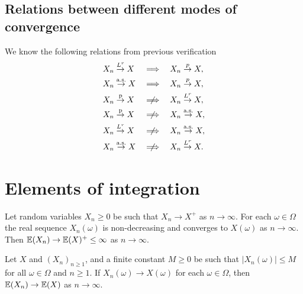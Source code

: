 \documentclass[10pt, a4paper]{article}
\begin{document}
\subsection{Relations between different modes of convergence}
We know the following relations from previous verification
\begin{align*}
    X_n &\overset{L ^ r}{\to} X &\implies && X_n &\overset{p}{\to} X, \\
    X_n &\overset{\text{a.s.}}{\to} X &\implies && X_n &\overset{p}{\to} X, \\
    X_n &\overset{\text{p}}{\to} X &\centernot\implies && X_n &\overset{L ^ r}{\to} X, \\
    X_n &\overset{\text{p}}{\to} X &\centernot\implies && X_n &\overset{\text{a.s.}}{\to} X, \\
    X_n &\overset{L ^ r}{\to} X &\centernot\implies && X_n &\overset{\text{a.s.}}{\to} X, \\
    X_n &\overset{\text{a.s.}}{\to} X &\centernot\implies && X_n &\overset{L ^ r}{\to} X.
\end{align*}

\newpage

\section{Elements of integration}

\begin{theorem}
    Let random variables $X_n \geq 0$ be such that $X_n \to X ^ {+}$ as $n \to \infty$.
    For each $\omega \in \Omega$ the real sequence $X_n(\omega)$ is non-decreasing and converges to $X(\omega)$ as $n \to \infty$.
    Then $\mathbb{E}(X_n) \to \mathbb{E}(X) ^ {+} \leq \infty$ as $n \to \infty$.
\end{theorem}

\begin{theorem}
    Let $X$ and $(X_n)_{n \geq 1}$,
    and a finite constant $M \geq 0$ be such that $|X_n(\omega)| \leq M$ for all $\omega \in \Omega$ and $n \geq 1$.
    If $X_n(\omega) \to X(\omega)$ for each $\omega \in \Omega$,
    then $\mathbb{E}(X_n) \to \mathbb{E}(X)$ as $n \to \infty$.
\end{theorem}
\end{document}
